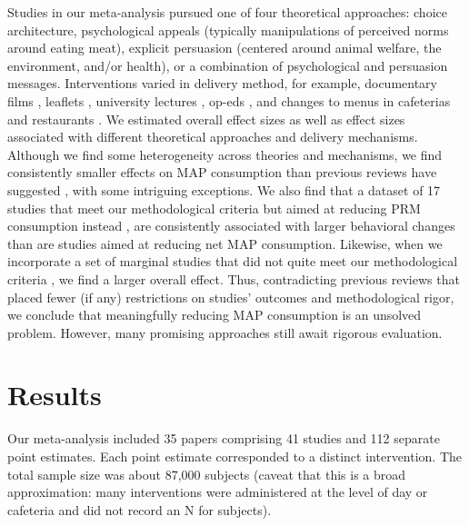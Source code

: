 \documentclass[sn-nature,referee,pdflatex]{sn-jnl}
\begin{document}
Studies in our meta-analysis pursued one of four theoretical approaches:
choice architecture, psychological appeals (typically manipulations of
perceived norms around eating meat), explicit persuasion (centered
around animal welfare, the environment, and/or health), or a combination
of psychological and persuasion messages. Interventions varied in
delivery method, for example, documentary films
\citep{mathur2021effectiveness}, leaflets \citep{peacock2017},
university lectures \citep{jalil2023}, op-eds \citep{haile2021}, and
changes to menus in cafeterias \citep{andersson2021} and restaurants
\citep{coker2022, sparkman2021}. We estimated overall effect sizes as
well as effect sizes associated with different theoretical approaches
and delivery mechanisms. Although we find some heterogeneity across
theories and mechanisms, we find consistently smaller effects on MAP
consumption than previous reviews have suggested
\citep{bianchi2018restructuring, byerly2018, chang2023, harguess2020, kwasny2022, mathur2021meta, meier2022},
with some intriguing exceptions. We also find that a dataset of 17
studies that meet our methodological criteria but aimed at reducing PRM
consumption instead
\citep{anderson2017, carfora2017correlational, carfora2017randomised, carfora2019, carfora2019informational, delichatsios2001talking, dijkstra2022, emmons2005cancer, emmons2005project, jaacks2014, james2015, lee2018, lindstrom2015, perino2022, schatzkin2000, sorensen2005, wolstenholme2020},
are consistently associated with larger behavioral changes than are
studies aimed at reducing net MAP consumption. Likewise, when we
incorporate a set of marginal studies that did not quite meet our
methodological criteria
\citep{alblas2023, beresford2006, betterfoodfoundation2023, celis2017, dannenberg2023, delichatsios2001eatsmart, epperson2021, frie2022, garnett2020, griesoph2021, hansen2021, johansen2009, kaiser2020, lentz2019, loy2016, matthews2019, piazza2022, reinders2017, sparkman2017},
we find a larger overall effect. Thus, contradicting previous reviews
that placed fewer (if any) restrictions on studies' outcomes and
methodological rigor, we conclude that meaningfully reducing MAP
consumption is an unsolved problem. However, many promising approaches
still await rigorous evaluation.

\section{Results}\label{sec2}

Our meta-analysis included 35 papers comprising 41 studies and 112
separate point estimates. Each point estimate corresponded to a distinct
intervention. The total sample size was about 87,000 subjects (caveat
that this is a broad approximation: many interventions were administered
at the level of day or cafeteria and did not record an N for subjects).
\end{document}
